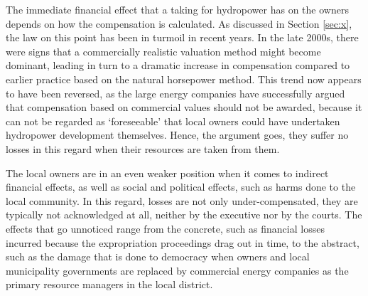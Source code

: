 
The immediate financial effect that a taking for hydropower has on the owners depends on how the compensation is calculated. As discussed in Section \ref{sec:x}, the law on this point has been in turmoil in recent years. In the late 2000s, there were signs that a commercially realistic valuation method might become dominant, leading in turn to a dramatic increase in compensation compared to earlier practice based on the natural horsepower method. This trend now appears to have been reversed, as the large energy companies have successfully argued that compensation based on commercial values should not be awarded, because it can not be regarded as `foreseeable' that local owners could have undertaken hydropower development themselves. Hence, the argument goes, they suffer no losses in this regard when their resources are taken from them.

The local owners are in an even weaker position when it comes to indirect financial effects, as well as social and political effects, such as harms done to the local community. In this regard, losses are not only under-compensated, they are typically not acknowledged at all, neither by the executive nor by the courts. The effects that go unnoticed range from the concrete, such as financial losses incurred because the expropriation proceedings drag out in time, to the abstract, such as the damage that is done to democracy when owners and local municipality governments are replaced by commercial energy companies as the primary resource managers in the local district.


